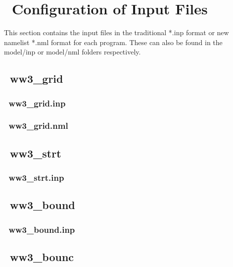 \pagestyle{myheadings} \setcounter{page}{1} \setcounter{footnote}{0}

\section{~Configuration of Input Files} \label{app:config}
\newcounters

This section contains the input files in the traditional *.inp format or new 
namelist *.nml format for each program. These can also be found in the {\file 
model/inp} or {\file model/nml} folders respectively.  

\vssub
\subsection{~ww3\_grid}
\vsssub
\subsubsection{~ww3\_grid.inp} \label{sec:config011}
\vsssub

\vsssub
\subsubsection{~ww3\_grid.nml} \label{sec:config012}
\vsssub
\vssub

\vssub
\subsection{~ww3\_strt}
\vsssub
\subsubsection{~ww3\_strt.inp} \label{sec:config021}
\vsssub
\vssub


\vssub
\subsection{~ww3\_bound}
\vsssub
\subsubsection{~ww3\_bound.inp} \label{sec:config031}
\vsssub
\vssub


\vssub
\subsection{~ww3\_bounc}
\vsssub
